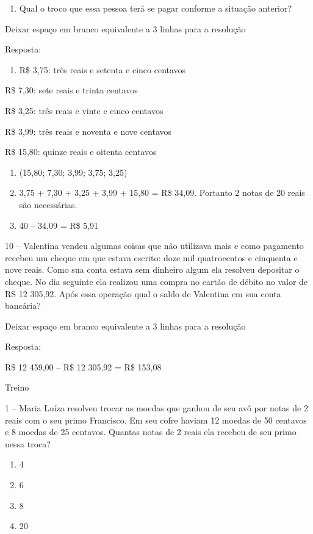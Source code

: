 \begin{enumerate}
\def\labelenumi{\alph{enumi})}
\item
  Qual o troco que essa pessoa terá se pagar conforme a situação
  anterior?
\end{enumerate}

Deixar espaço em branco equivalente a 3 linhas para a resolução

Resposta:

\begin{enumerate}
\def\labelenumi{\alph{enumi})}
\item
  R\$ 3,75: três reais e setenta e cinco centavos
\end{enumerate}

R\$ 7,30: sete reais e trinta centavos

R\$ 3,25: três reais e vinte e cinco centavos

R\$ 3,99: três reais e noventa e nove centavos

R\$ 15,80: quinze reais e oitenta centavos

\begin{enumerate}
\def\labelenumi{\alph{enumi})}
\item
  (15,80; 7,30; 3,99; 3,75; 3,25)
\item
  3,75 + 7,30 + 3,25 + 3,99 + 15,80 = R\$ 34,09. Portanto 2 notas de 20
  reais são necessárias.
\item
  40 -- 34,09 = R\$ 5,91
\end{enumerate}

10 -- Valentina vendeu algumas coisas que não utilizava mais e como
pagamento recebeu um cheque em que estava escrito: doze mil quatrocentos
e cinquenta e nove reais. Como sua conta estava sem dinheiro algum ela
resolveu depositar o cheque. No dia seguinte ela realizou uma compra no
cartão de débito no valor de RS 12 305,92. Após essa operação qual o
saldo de Valentina em sua conta bancária?

Deixar espaço em branco equivalente a 3 linhas para a resolução

Resposta:

R\$ 12 459,00 -- R\$ 12 305,92 = R\$ 153,08

Treino

1 -- Maria Luíza resolveu trocar as moedas que ganhou de seu avô por
notas de 2 reais com o seu primo Francisco. Em seu cofre haviam 12
moedas de 50 centavos e 8 moedas de 25 centavos. Quantas notas de 2
reais ela recebeu de seu primo nessa troca?

\begin{enumerate}
\def\labelenumi{\alph{enumi})}
\item
  4
\item
  6
\item
  8
\item
  20
\end{enumerate}

